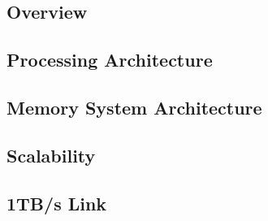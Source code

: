 

\subsection{Overview}
\label{sec:overview}


\subsection{Processing Architecture}
\label{sec:processing}


\subsection{Memory System Architecture}
\label{sec:memory}


\subsection{Scalability}
\label{sec:scale}


\subsection{1TB/s Link}
\label{sec:link}

